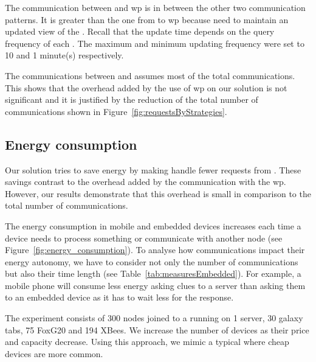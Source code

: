 The communication between \consumers{} and \ac{wp} is in between the other two communication patterns.
It is greater than the one from \providers{} to \ac{wp} because \consumers{} need to maintain an updated view of the \Space{}.
Recall that the update time depends on the query frequency of each \consumer{}.
The maximum and minimum updating frequency were set to 10 and 1 minute(s) respectively.

The communications between \consumers{} and \providers{} assumes most of the total communications.
This shows that the overhead added by the use of \ac{wp} on our solution is not significant and it is justified by the reduction of the total number of communications shown in Figure~\ref{fig:requestsByStrategies}.





\subsection{Energy consumption}
\label{sec:energyConsumption}
Our solution tries to save energy by making \providers{} handle fewer requests from \consumers{}.
These savings contrast to the overhead added by the communication with the \ac{wp}.
However, our results demonstrate that this overhead is small in comparison to the total number of communications.

The energy consumption in mobile and embedded devices increases each time a device needs to process something or communicate with another node (see Figure~\ref{fig:energy_consumption}).
To analyse how communications impact their energy autonomy, we have to consider not only the number of communications but also their time length (see Table~\ref{tab:measuresEmbedded}).
For example, a mobile phone will consume less energy asking clues to a server than asking them to an embedded device as it has to wait less for the response.




The experiment consists of 300 nodes joined to a \Space{} running on 1 server, 30 galaxy tabs, 75 FoxG20 and 194 XBees.
We increase the number of devices as their price and capacity decrease.
Using this approach, we mimic a typical \Space{} where cheap devices are more common.

